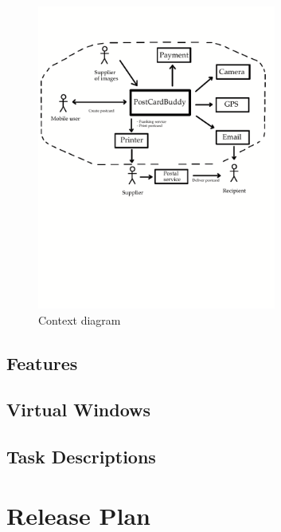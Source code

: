 \documentclass[10pt,a4paper]{article}
\begin{document}
\begin{figure}[h!]
\centering
\includegraphics[width=0.7\textwidth]{ContextDiagram2.pdf}
\caption{Context diagram}
\label{fig:context}
\end{figure}

\subsection{Features}
\subsection{Virtual Windows}
\subsection{Task Descriptions}



\section{Release Plan}
\end{document}
